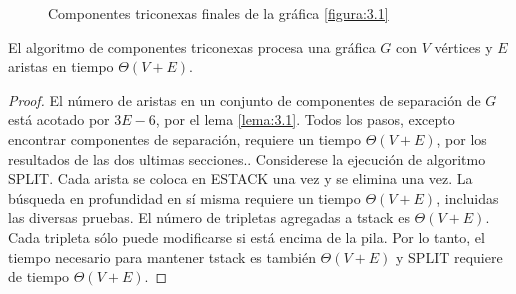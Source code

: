 \begin{figure}[H]
\begin{center}
\begin{subfigure}[b]{0.8\textwidth}
        \end{subfigure}
        \end{center}
     \caption{Componentes triconexas finales de la gráfica \ref{figura:3.1}}
    \label{figura:3.6}
\end{figure}

\begin{lemma}
El algoritmo de componentes triconexas procesa una gráfica $G$ con $V$ vértices y $E$ aristas en tiempo $\Theta \left(V + E\right)$.
\label{lema:3.15}
\end{lemma}

\begin{proof}
El número de aristas en un conjunto de componentes de separación de $G$ está acotado por $3E - 6$, por el lema \ref{lema:3.1}. Todos los pasos, excepto encontrar componentes de separación, requiere un tiempo $\Theta\left(V+ E\right)$, por los resultados de las dos ultimas secciones.. Considerese la ejecución de algoritmo SPLIT. Cada arista se coloca en ESTACK una vez y se elimina una vez. La búsqueda en profundidad en sí misma requiere un tiempo $\Theta\left(V + E\right)$, incluidas las diversas pruebas. El número de tripletas agregadas a tstack es $\Theta\left(V + E\right)$. Cada tripleta sólo puede modificarse si está encima de la pila. Por lo tanto, el tiempo necesario para mantener tstack es también $\Theta\left(V + E\right)$ y SPLIT requiere de tiempo $\Theta\left(V + E\right)$.
\end{proof}
